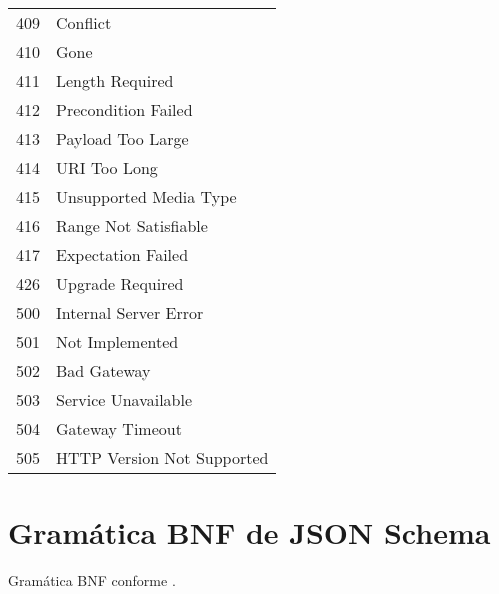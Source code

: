\begin{anexosenv}
\begin{table}[H]
\begin{tabular}{|l|l|}
    409  & Conflict                      \\
    410  & Gone                          \\
    411  & Length Required               \\
    412  & Precondition Failed           \\
    413  & Payload Too Large             \\
    414  & URI Too Long                  \\
    415  & Unsupported Media Type        \\
    416  & Range Not Satisfiable         \\
    417  & Expectation Failed            \\
    426  & Upgrade Required              \\
    500  & Internal Server Error         \\
    501  & Not Implemented               \\
    502  & Bad Gateway                   \\
    503  & Service Unavailable           \\
    504  & Gateway Timeout               \\
    505  & HTTP Version Not Supported    \\
    \hline
    \end{tabular}
\end{table}

\chapter{Gramática BNF de JSON Schema}
\label{anexo:bnfjs}
Gramática BNF conforme .


\end{anexosenv}
